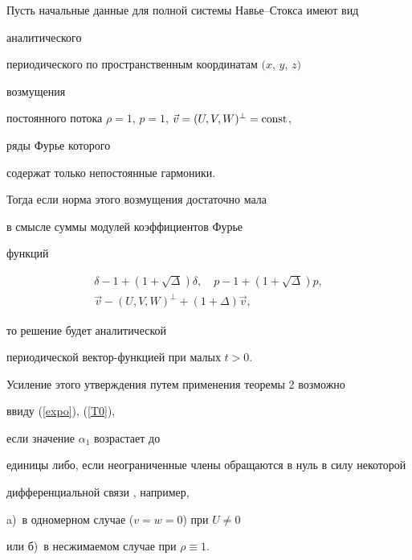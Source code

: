 \begin{thm}


Пусть начальные данные для полной системы Навье--Стокса имеют вид


аналитического


периодического по пространственным координатам $(x$, $y$, $z)$


возмущения


постоянного потока $\rho=1$, $p=1$, $\Vec{v}=(U,V,W)^\perp=\operatorname{const}$,


ряды Фурье которого


содержат только непостоянные гармоники.


Тогда если норма этого возмущения достаточно мала


в смысле суммы модулей коэффициентов Фурье


функций


\begin{equation}


\label{small}


\begin{array}{c}


\delta-1+(1+\sqrt{\Delta})\delta,\quad p-1+(1+\sqrt{\Delta}) p,\\[2mm]


%


\Vec{v}-(U,V,W)^\perp+(1+\Delta) \Vec{v},


\end{array}


\end{equation}


то решение будет аналитической


периодической вектор-функцией при малых $t>0$.


\end{thm}





Усиление этого утверждения путем применения теоремы 2 возможно


ввиду (\ref{expo}), (\ref{T0}),


если значение $\alpha_1$ возрастает до


единицы либо, если неограниченные члены обращаются в нуль в силу некоторой


дифференциальной связи \cite{SidorovShapeevYanenko}, например,


a)~в одномерном случае ($v=w=0$) при $U\neq0$


или б)~в несжимаемом случае при $\rho\equiv1$.





